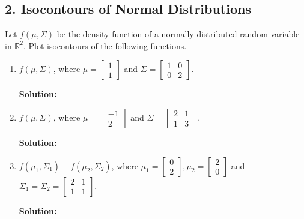 \documentclass{article}
\newcommand{\solution}{\textbf{Solution: }}
\renewcommand{\R}{\mathbb{R}}
\begin{document}
\subsection*{2. Isocontours of Normal Distributions}
Let $f(\mu, \Sigma)$ be the density function of a normally distributed random variable in $\R^2$. Plot isocontours of the following functions.
\begin{enumerate}[label=(\alph*)]
    \item $f(\mu, \Sigma)$, where $\mu = \begin{bmatrix}1 \\ 1 \end{bmatrix}$ and $\Sigma = \begin{bmatrix} 1 & 0  \\ 0 & 2 \end{bmatrix}$.
    \begin{mdframed} \solution
    \end{mdframed}

    \item $f(\mu, \Sigma)$, where $\mu = \begin{bmatrix}-1 \\ 2 \end{bmatrix}$ and $\Sigma = \begin{bmatrix} 2 & 1  \\ 1 & 3 \end{bmatrix}$.
    \begin{mdframed} \solution
    \end{mdframed}

    \item $f(\mu_1, \Sigma_1) - f(\mu_2, \Sigma_2)$, where $\mu_1 = \begin{bmatrix} 0 \\ 2 \end{bmatrix}, \mu_2 = \begin{bmatrix} 2 \\ 0 \end{bmatrix}$ and $\Sigma_1 = \Sigma_2 = \begin{bmatrix} 2 & 1 \\ 1 & 1 \end{bmatrix}$.
    \begin{mdframed} \solution
    \end{mdframed}


\end{enumerate}
\end{document}
